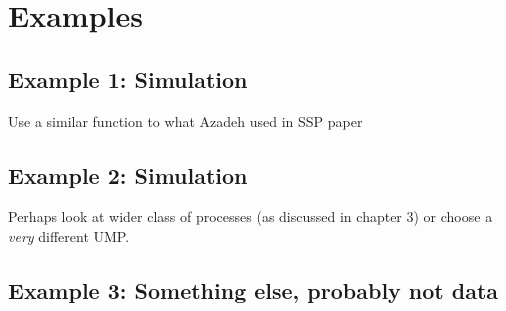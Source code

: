 \chapter{Examples} \label{chap:chap4}

\section{Example 1: Simulation}
Use a similar function to what Azadeh used in SSP paper

\section{Example 2: Simulation}
Perhaps look at wider class of processes (as discussed in chapter 3) or choose a \textit{very} different UMP.

\section{Example 3: Something else, probably not data}








